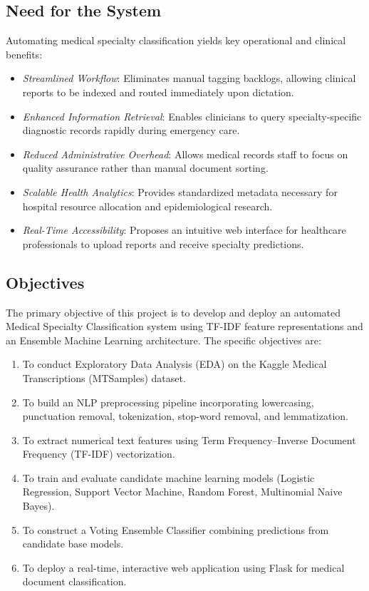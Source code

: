 \subsection{Need for the System}
Automating medical specialty classification yields key operational and clinical benefits:
\begin{itemize}
    \item \textit{Streamlined Workflow}: Eliminates manual tagging backlogs, allowing clinical reports to be indexed and routed immediately upon dictation.
    \item \textit{Enhanced Information Retrieval}: Enables clinicians to query specialty-specific diagnostic records rapidly during emergency care.
    \item \textit{Reduced Administrative Overhead}: Allows medical records staff to focus on quality assurance rather than manual document sorting.
    \item \textit{Scalable Health Analytics}: Provides standardized metadata necessary for hospital resource allocation and epidemiological research.
    \item \textit{Real-Time Accessibility}: Proposes an intuitive web interface for healthcare professionals to upload reports and receive specialty predictions.
\end{itemize}

\subsection{Objectives}
The primary objective of this project is to develop and deploy an automated Medical Specialty Classification system using TF-IDF feature representations and an Ensemble Machine Learning architecture. The specific objectives are:
\begin{enumerate}
    \item To conduct Exploratory Data Analysis (EDA) on the Kaggle Medical Transcriptions (MTSamples) dataset.
    \item To build an NLP preprocessing pipeline incorporating lowercasing, punctuation removal, tokenization, stop-word removal, and lemmatization.
    \item To extract numerical text features using Term Frequency--Inverse Document Frequency (TF-IDF) vectorization.
    \item To train and evaluate candidate machine learning models (Logistic Regression, Support Vector Machine, Random Forest, Multinomial Naive Bayes).
    \item To construct a Voting Ensemble Classifier combining predictions from candidate base models.
    \item To deploy a real-time, interactive web application using Flask for medical document classification.
\end{enumerate}

